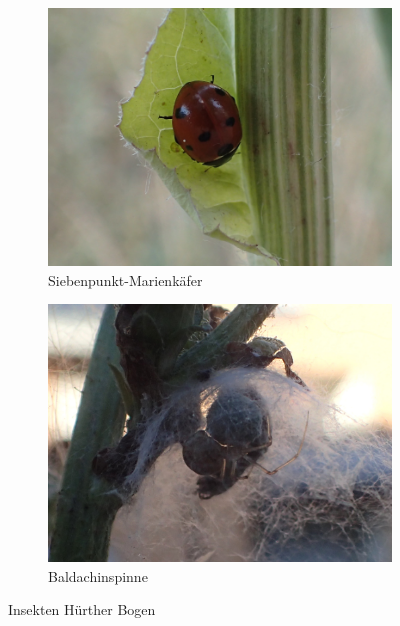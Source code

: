 \documentclass[10pt]{article}
\begin{document}
\begin{figure}[h!]
\begin{subfigure}[b]{0.44\linewidth}
    \includegraphics[width=\linewidth]{img/bogen/siebenpunkt.jpg}
    \caption{Siebenpunkt-Marienkäfer}
  \end{subfigure}
  \begin{subfigure}[b]{0.44\linewidth}
    \includegraphics[width=\linewidth]{img/bogen/trapezspinne.jpg}
    \caption{Baldachinspinne}
  \end{subfigure}
  \caption{Insekten Hürther Bogen}
\end{figure}

\clearpage
\end{document}
